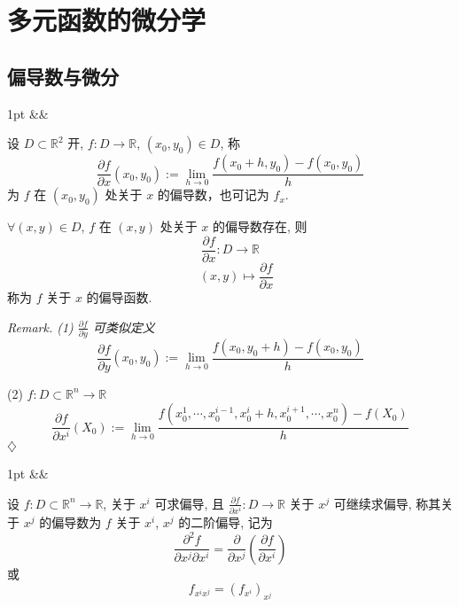 \documentclass[a4paper]{article}
\newcommand{\R}{\mathbb{R}}
\newenvironment{formal}[1][]{%
\def\FrameCommand{%
\hspace{1pt}%
{\color{formalline}\vrule width 2pt}%
{\color{formalshade}\vrule width 4pt}%
\colorbox{formalshade}%
}%
\MakeFramed{\advance\hsize-\width\FrameRestore}%
\noindent
\hspace{-4.55pt}%
\begin{adjustwidth}{}{1pt}%
\setlength{\parindent}{0pt}%
\vspace{3pt}%
\ifx&#1&\else %
\textbf{#1}\par
\vspace{1pt}%
\fi }{%
\vspace{2pt}%
\end{adjustwidth}\endMakeFramed%
}
\newenvironment{remark}{%
\par
\smallskip
\noindent
\itshape Remark. }{%
\smallskip
\hfill$\diamondsuit$ \par}
\begin{document}
    \section{多元函数的微分学}

    \subsection{偏导数与微分}

    \begin{formal}
        [偏导数] 设 $D \subset \R^{2}$ 开, $f: D \rightarrow \R$, $(x_{0}, y_{0})
        \in D$, 称
        \[
            \frac{\partial f}{\partial x}(x_{0}, y_{0}) := \lim_{h \to 0}\frac{f(x_{0}+
            h, y_{0}) - f(x_{0}, y_{0})}{h}
        \]
        为 $f$ 在 $(x_{0}, y_{0})$ 处关于 $x$ 的偏导数，也可记为 $f_{x}$.

        $\forall (x, y) \in D$, $f$ 在 $(x, y)$ 处关于 $x$ 的偏导数存在, 则
        \[
            \frac{\partial f}{\partial x}: D \longrightarrow \R
        \]
        \[
            \quad (x, y) \longmapsto \frac{\partial f}{\partial x}
        \]
        称为 $f$ 关于 $x$ 的偏导函数.
    \end{formal}

    \begin{remark}
        (1) $\frac{\partial f}{\partial y}$ 可类似定义
        \[
            \frac{\partial f}{\partial y}(x_{0}, y_{0}) := \lim_{h \to 0}\frac{f(x_{0},
            y_{0}+ h) - f(x_{0}, y_{0})}{h}
        \]

        (2) $f: D \subset \R^{n}\longrightarrow \R$
        \[
            \frac{\partial f}{\partial x^{i}}(X_{0}) := \lim_{h \to 0}\frac{f(x_{0}^{1},
            \cdots, x_{0}^{i-1}, x_{0}^{i}+ h, x_{0}^{i+1}, \cdots, x_{0}^{n}) -
            f(X_{0})}{h}
        \]
    \end{remark}

    \begin{formal}
        [高阶偏导] 设 $f: D \subset \R^{n}\to \R$, 关于 $x^{i}$ 可求偏导, 且 $\frac{\partial
        f}{\partial x^{i}}: D \to \R$ 关于 $x^{j}$ 可继续求偏导, 称其关于
        $x^{j}$ 的偏导数为 $f$ 关于 $x^{i}$, $x^{j}$ 的二阶偏导, 记为
        \[
            \frac{\partial^{2}f}{\partial x^{j}\partial x^{i}}= \frac{\partial}{\partial
            x^{j}}\left( \frac{\partial f}{\partial x^{i}}\right)
        \]
        或
        \[
            f_{x^i x^j}= (f_{x^i})_{x^j}
        \]
    \end{formal}
\end{document}
